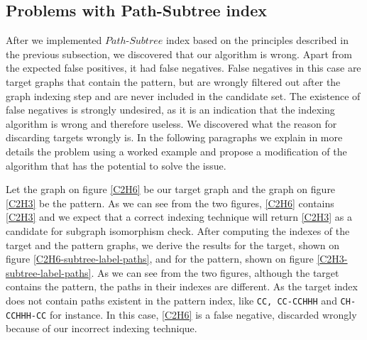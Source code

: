 \documentclass{l4proj}
\theoremstyle{definition}
\begin{document}
\subsection{Problems with Path-Subtree index}
\label{path-subtree index problems}
After we implemented $Path$-$Subtree$ index based on the principles described in the previous subsection, we discovered that our algorithm is wrong. Apart from the expected false positives, it had false negatives. False negatives in this case are target graphs that contain the pattern, but are wrongly filtered out after the graph indexing step and are never included in the candidate set. The existence of false negatives is strongly undesired, as it is an indication that the indexing algorithm is wrong and therefore useless. We discovered what the reason for discarding targets wrongly is. In the following paragraphs we explain in more details the problem using a worked example and propose a modification of the algorithm that has the potential to solve the issue.\par
Let the graph on figure \ref{C2H6} be our target graph and the graph on figure \ref{C2H3} be the pattern. As we can see from the two figures, \ref{C2H6} contains \ref{C2H3} and we expect that a correct indexing technique will return \ref{C2H3} as a candidate for subgraph isomorphism check. After computing the indexes of the target and the pattern graphs, we derive the results for the target, shown on figure \ref{C2H6-subtree-label-paths}, and for the pattern, shown on figure \ref{C2H3-subtree-label-paths}. As we can see from the two figures, although the target contains the pattern, the paths in their indexes are different. As the target index does not contain paths existent in the pattern index, like \texttt{CC, CC-CCHHH} and \texttt{CH-CCHHH-CC} for instance. In this case, \ref{C2H6} is a false negative, discarded wrongly because of our incorrect indexing technique.\par
\end{document}
